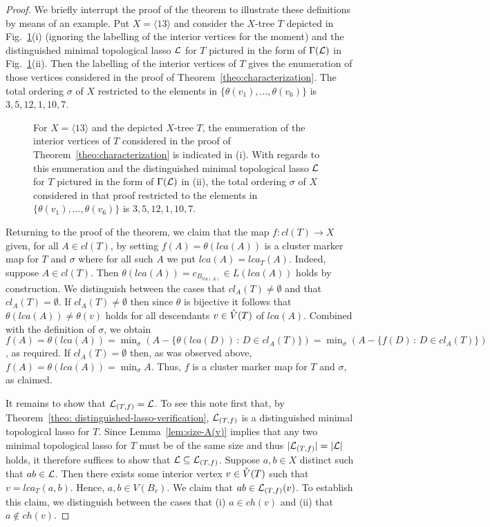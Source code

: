 \begin{proof}
We briefly interrupt the proof of the theorem 
to illustrate these definitions
by means of an example. Put $X=\langle 13\rangle$ and consider the $X$-tree
$T$ depicted in  Fig.~\ref{fig:illustration-main-theorem}(i) (ignoring the
labelling of the interior vertices for the moment) and the distinguished
minimal topological lasso ${\mathcal L}$ for $T$ pictured in the form of 
$\Gamma({\mathcal L})$ in Fig.~\ref{fig:illustration-main-theorem}(ii). Then
the labelling of the interior vertices of $T$ gives the 
enumeration of those vertices considered in the
proof of Theorem~\ref{theo:characterization}. The total ordering $\sigma$
of $X$ restricted to the elements in $\{\theta(v_1),\ldots, \theta(v_6)\}$
is $3,5,12,1,10,7$. 
%
\begin{figure}[h]
\begin{center}

\end{center}
\caption{\label{fig:illustration-main-theorem}
For  $X=\langle 13\rangle$ and the depicted $X$-tree $T$,
the enumeration of the interior vertices of $T$ 
considered in the proof of Theorem~\ref{theo:characterization} is indicated
in (i). With regards to this enumeration and the distinguished minimal 
topological lasso ${\mathcal L}$ for $T$ pictured in the form of $\Gamma({\mathcal L})$
in (ii), the total ordering $\sigma$ of $X$ considered in
that proof restricted to the elements in $\{\theta(v_1),\ldots, \theta(v_6)\}$
is $3,5,12,1,10,7$.
}
\end{figure}

Returning to the proof of the theorem, 
we claim that the map $f:cl(T)\to X$ given,
for all $A\in cl(T)$, by setting $f(A)=\theta(lca(A))$ is a cluster
marker map for $T$ and $\sigma$ where for all such $A$ we
put $lca(A)=lca_T(A)$. Indeed, suppose $A\in cl(T)$.
Then $\theta(lca(A))=c_{B_{lca(A)}}\in L(lca(A))$ holds by construction.
We distinguish between the cases that $cl_A(T)\not =\emptyset$ and that
$cl_A(T)=\emptyset$. If $cl_A(T)\not =\emptyset$
then since $\theta$ is bijective it follows that
 $\theta(lca(A))\not=\theta(v)$ holds for all descendants
 $v\in \mathring{V}(T)$ of $lca(A)$.
Combined with the definition of $\sigma$, we obtain  
$f(A)=\theta(lca(A))=\min_{\sigma}(A-\{\theta(lca(D))\,:\, D\in cl_A(T)\})=
\min_{\sigma}(A-\{f(D)\,:\, D\in cl_A(T)\})$, as required. 
If $cl_A(T)=\emptyset$ then, as was observed above,
 $f(A)=\theta(lca(A))=\min_{\sigma}A$. Thus,
$f$ is a cluster marker map for $T$ and $\sigma$, as claimed.

It remains to show that ${\mathcal L}_{(T,f)}={\mathcal L}$. To see this note first
that, by Theorem~\ref{theo: distinguished-lasso-verification}, 
${\mathcal L}_{(T,f)}$ is a distinguished minimal topological lasso for $T$. Since
Lemma~\ref{lem:size-A(v)} implies that any
two minimal topological lasso for $T$ must be of
the same size and thus $|{\mathcal L}_{(T,f)}|=|{\mathcal L}|$ holds, it therefore
suffices to show that ${\mathcal L}\subseteq {\mathcal L}_{(T,f)}$. Suppose $a,b\in X$ distinct
 such that $ab\in {\mathcal L}$.
Then there exists some interior vertex $v\in \mathring{V}(T)$ such that $v=lca_T(a,b)$.
Hence, $a,b\in V(B_v)$. We claim that $ab\in {\mathcal L}_{(T,f)}(v)$.
To establish this claim,
we  distinguish between the cases that (i) $a\in ch(v)$ and (ii) that
$a\not\in ch(v)$.


\end{proof}
